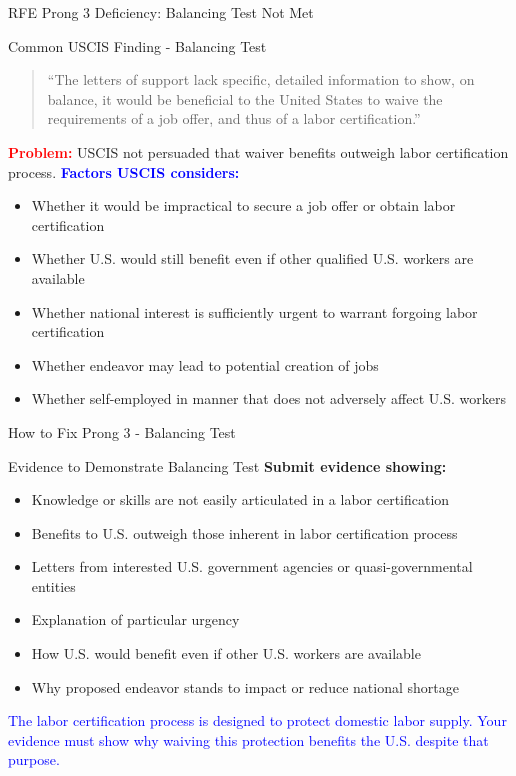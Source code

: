 \documentclass[11pt]{beamer}
\begin{document}
	\begin{frame}{RFE Prong 3 Deficiency: Balancing Test Not Met}
		\scriptsize
		\begin{block}{Common USCIS Finding - Balancing Test}
			\begin{quote}
				``The letters of support lack specific, detailed information to show, on balance, it would be beneficial to the United States to waive the requirements of a job offer, and thus of a labor certification.''
			\end{quote}
			\textcolor{red}{\textbf{Problem:}} USCIS not persuaded that waiver benefits outweigh labor certification process.
			\vspace{0.2cm}
			\textcolor{blue}{\textbf{Factors USCIS considers:}}
			\begin{itemize}
				\item Whether it would be impractical to secure a job offer or obtain labor certification
				\item Whether U.S. would still benefit even if other qualified U.S. workers are available
				\item Whether national interest is sufficiently urgent to warrant forgoing labor certification
				\item Whether endeavor may lead to potential creation of jobs
				\item Whether self-employed in manner that does not adversely affect U.S. workers
			\end{itemize}
		\end{block}
	\end{frame}
	
	\begin{frame}{How to Fix Prong 3 - Balancing Test}
		\scriptsize
		\begin{block}{Evidence to Demonstrate Balancing Test}
			\textbf{Submit evidence showing:}
			\begin{itemize}
				\item Knowledge or skills are not easily articulated in a labor certification
				\item Benefits to U.S. outweigh those inherent in labor certification process
				\item Letters from interested U.S. government agencies or quasi-governmental entities
				\item Explanation of particular urgency
				\item How U.S. would benefit even if other U.S. workers are available
				\item Why proposed endeavor stands to impact or reduce national shortage
			\end{itemize}
			\textcolor{blue}{The labor certification process is designed to protect domestic labor supply. Your evidence must show why waiving this protection benefits the U.S. despite that purpose.}
		\end{block}
	\end{frame}
	
\end{document}
